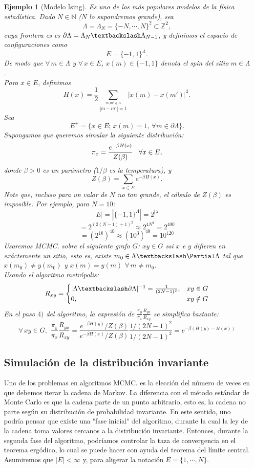 \documentclass[a4paper]{article}
\newtheorem{ejemplo}{Ejemplo}
\numberwithin{equation}{subsection}
\def\N{\mathbb N}
\def\Z{\mathbb Z}
\begin{document}
\begin{ejemplo}[Modelo Ising]
Es uno de los más populares modelos de la física estadística. Dado $N\in \N$ ($N$ lo supondremos grande), sea 
\[\Lambda = \Lambda_N = \{-N,\cdots,N\}^2 \subset \Z^2,\]
cuya frontera es es $\partial \Lambda =\Lambda_N \textbackslash \Lambda_{N-1}$, y definimos el \textit{espacio de configuraciones} como
\[E = \{-1,1\}^{\Lambda}.\]
De modo que $\forall\,m\in \Lambda$ y $\forall\,x\in E$, $x(m)\in \{-1,1\}$ denota el \textit{spin} del sitio $m\in \Lambda$.\\
Para $x\in E$, definimos 
\[H(x) = \frac{1}{2}\sum_{\overset{m,m'\in\Lambda}{|m-m'|=1} }|x(m)-x(m')|^2.\]
Sea
\[E^{+} = \{x \in E;\,x(m)=1,\,\forall m \in \partial \Lambda\}.\]
Supongamos que queremos simular la siguiente distribución:
\[\pi_x = \frac{e^{-\beta H(x)}}{Z(\beta)}\hspace{0.3cm}\forall x\in E,\]
donde $\beta >0$ es un parámetro ($1/\beta$ es la temperatura), y 
\[Z(\beta) = \sum_{x\in E}e^{-\beta H(x)}.\]
Note que, incluso para un valor de $N$ no tan grande, el cálsulo de $Z(\beta)$ es imposible. Por ejemplo, para $N=10$:
\[|E| = |\{-1,1\}^{\Lambda}| = 2^{|\lambda|}\]
\[= 2^{(2(N-1)+1)^2} \approx 2^{4N^2} = 2^{ 400}\]
\[=(2^{10})^{40} \approx (10^3)^{40} = 10^{120}\]
Usaremos MCMC. sobre el siguiente grafo $G$: $xy \in G$ ssi $x$ e $y$ difieren en exáctemente un sitio, esto es, existe $m_0 \in \Lambda \textbackslash \Partial \Lambda$ tal que $x(m_0) \neq y(m_0)$ y $x(m)=y(m)$ $\forall\,m\neq m_0$.\\
Usando el algoritmo metrópolis:
\[R_{xy} = \begin{cases}
|\Lambda \textbackslash \partial \Lambda |^{-1} = \frac{1}{(2N-1)^2}, & xy\in G\\
0, & xy \notin G
\end{cases}\]
En el paso $4)$ del algoritmo, la expresión de $\frac{\pi_y}{\pi_x}\frac{R_{yx}}{R_{xy}}$ se simplifica bastante:
\[\forall\,xy\in G,\,\,\frac{\pi_y}{\pi_x}\frac{R_{yx}}{R_{xy}} = \frac{e^{-\beta H(y)}/Z(\beta)}{e^{-\beta H(x)}/Z(\beta)} \frac{1/(2N-1)^{2}}{1/(2N-1)^{2}} = e^{-\beta(H(y)-H(x))}\]
\end{ejemplo}

\subsection{Simulación de la distribución invariante}
Uno de los problemas en algoritmos MCMC. es la elección del número de veces en que debemos iterar la cadena de Markov. La diferencia con el método estándar de Monte Carlo es que la cadena parte de un punto arbitrario, esto es, la cadena no parte según su distribución de probabilidad invariante. En este sentido, uno podría pensar que existe una "fase inicial" del algoritmo, durante la cual la ley de la cadena toma valores cercanos a la distribución invariante. Entonces, durante la segunda fase del algoritmo, podríamos controlar la taza de convergencia en el teorema ergódico, lo cual se puede hacer con ayuda del teorema del límite central. \\ Asumiremos que $|E| < \infty$ y, para aligerar la notación $E=\{1,\cdots,N\}$.
\end{document}
